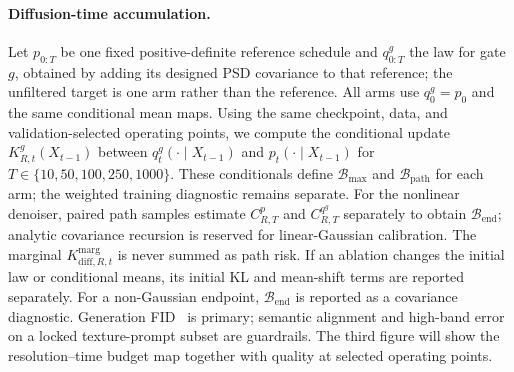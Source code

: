 
\paragraph{Diffusion-time accumulation.}
Let $p_{0:T}$ be one fixed positive-definite reference schedule and
$q^g_{0:T}$ the law for gate $g$, obtained by adding its designed PSD covariance
to that reference; the unfiltered target is one arm rather than the reference.
All arms use $q^g_0=p_0$ and the same conditional mean maps. Using the same
checkpoint, data, and validation-selected operating points, we compute the
conditional update $K^g_{R,t}(X_{t-1})$ between
$q^g_t(\cdot\mid X_{t-1})$ and $p_t(\cdot\mid X_{t-1})$ for
$T\in\{10,50,100,250,1000\}$. These conditionals define
$\mathcal B_{\max}$ and $\mathcal B_{\mathrm{path}}$ for each arm; the
weighted training diagnostic remains separate. For the nonlinear denoiser,
paired path samples estimate $C^p_{R,T}$ and $C^{q^g}_{R,T}$ separately to
obtain $\mathcal B_{\mathrm{end}}$; analytic covariance recursion is reserved
for linear-Gaussian calibration. The marginal
$K^{\mathrm{marg}}_{\mathrm{diff},R,t}$ is never summed as path risk. If an
ablation changes the initial law or conditional means, its initial KL and
mean-shift terms are reported separately. For a non-Gaussian endpoint,
$\mathcal B_{\mathrm{end}}$ is reported as a covariance diagnostic. Generation
FID~\citep{heusel2017gans} is primary; semantic alignment and high-band error
on a locked texture-prompt subset are guardrails. The third figure will show the
resolution--time budget map together with quality at selected operating points.

